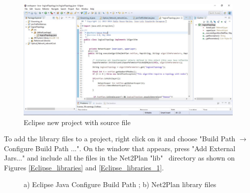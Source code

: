 	\vspace{1.5cm}
	\begin{figure}[h!]
		\centering
		\includegraphics[width = 13cm]{Eclipse_project_1.pdf}
		\caption{Eclipse new project with source file}
		\label{Eclipse_project_1}
	\end{figure}	
	
	To add the library files to a project, right click on it and choose "Build Path $\rightarrow$ Configure Build Path ...". On the window that appears, press "Add External Jars..." and include all the files in the Net2Plan "lib" \ directory as shown on Figures \ref{Eclipse_libraries} and \ref{Eclipse_libraries_1}.
	
	\vspace{1cm}
	\begin{figure}[!h]
		\centering
		\caption{a) Eclipse Java Configure Build Path ; b) Net2Plan library files}
	\end{figure}	
	

